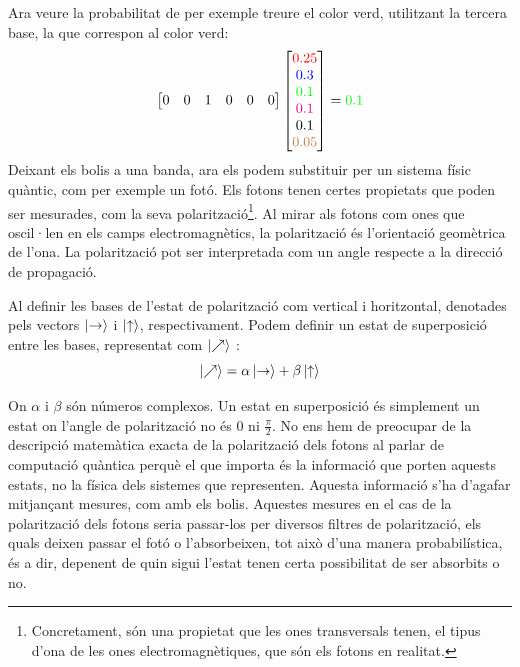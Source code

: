 Ara veure la probabilitat de per exemple treure el color verd, utilitzant la tercera base, la que correspon al color verd:
$$
\begin{bmatrix}
	0 & 0 & 1 & 0 & 0 & 0\\
\end{bmatrix}
\begin{bmatrix}
	\textcolor{red}{0.25} \\
	\textcolor{blue}{0.3 }\\
	\textcolor{green}{0.1 }\\
	\textcolor{magenta}{0.1 }\\
	\textcolor{black}{0.1 }\\
	\textcolor{brown}{0.05}
\end{bmatrix} = \textcolor{green}{0.1 }
$$
Deixant els bolis a una banda, ara els podem substituir per un sistema físic quàntic, com per exemple un fotó. Els fotons tenen certes propietats que poden ser mesurades, com la seva polarització\footnote{Concretament, són una propietat que les ones transversals tenen, el tipus d'ona de les ones electromagnètiques, que són els fotons en realitat.}. Al mirar als fotons com ones que oscil·len en els camps electromagnètics, la polarització és l'orientació geomètrica de l'ona. La polarització pot ser interpretada com un angle respecte a la direcció de propagació.

Al definir les bases de l'estat de polarització com vertical i horitzontal, denotades pels vectors $\ket{\text{\textrightarrow}}$ i $\ket{\text{\textuparrow}}$, respectivament. Podem definir un estat de superposició entre les bases, representat com $\ket{\nearrow}$ \cite{QC_intro:photon}:
\begin{equation}
	\ket{\nearrow} = \alpha\ket{\text{\textrightarrow}} + \beta\ket{\text{\textuparrow}}
	\label{eq:photon_state}
\end{equation}

On $\alpha$ i $\beta$ són números complexos. 
Un estat en superposició és simplement un estat on l'angle de polarització no és $0$ ni $\frac{\pi}{2}$. No ens hem de preocupar de la descripció matemàtica exacta de la polarització dels fotons al parlar de computació quàntica perquè el que importa és la informació que porten aquests estats, no la física dels sistemes que representen. Aquesta informació s'ha d'agafar mitjançant mesures, com amb els bolis. Aquestes mesures en el cas de la polarització dels fotons seria passar-los per diversos filtres de polarització, els quals deixen passar el fotó o l'absorbeixen, tot això d'una manera probabilística, és a dir, depenent de quin sigui l'estat tenen certa possibilitat de ser absorbits o no.

